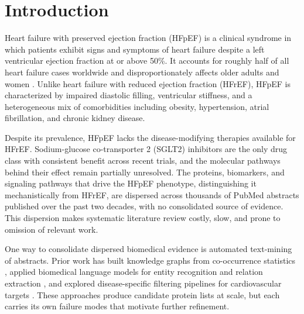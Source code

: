 \documentclass[sn-basic,pdflatex]{sn-jnl}
\begin{document}

\maketitle

\section{Introduction}
\label{sec:intro}

Heart failure with preserved ejection fraction (HFpEF) is a clinical syndrome in which patients exhibit signs and symptoms of heart failure despite a left ventricular ejection fraction at or above 50\%. It accounts for roughly half of all heart failure cases worldwide and disproportionately affects older adults and women \citep{northcott2021hfpef}. Unlike heart failure with reduced ejection fraction (HFrEF), HFpEF is characterized by impaired diastolic filling, ventricular stiffness, and a heterogeneous mix of comorbidities including obesity, hypertension, atrial fibrillation, and chronic kidney disease.

Despite its prevalence, HFpEF lacks the disease-modifying therapies available for HFrEF. Sodium-glucose co-transporter 2 (SGLT2) inhibitors are the only drug class with consistent benefit across recent trials, and the molecular pathways behind their effect remain partially unresolved. The proteins, biomarkers, and signaling pathways that drive the HFpEF phenotype, distinguishing it mechanistically from HFrEF, are dispersed across thousands of PubMed abstracts published over the past two decades, with no consolidated source of evidence. This dispersion makes systematic literature review costly, slow, and prone to omission of relevant work.

One way to consolidate dispersed biomedical evidence is automated text-mining of abstracts. Prior work has built knowledge graphs from co-occurrence statistics \citep{liem2018ecm,fang2021caseolap}, applied biomedical language models for entity recognition and relation extraction \citep{lee2020biobert,gu2021pubmedbert}, and explored disease-specific filtering pipelines for cardiovascular targets \citep{bhatt2024oxidative,urdang2025preeclampsia}. These approaches produce candidate protein lists at scale, but each carries its own failure modes that motivate further refinement.
\end{document}
